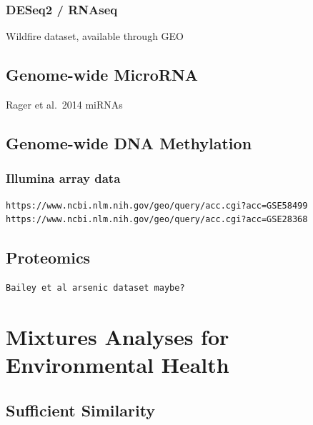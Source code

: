 \documentclass[
]{book}
\begin{document}
\hypertarget{deseq2-rnaseq}{%
\subsection{DESeq2 / RNAseq}\label{deseq2-rnaseq}}

Wildfire dataset, available through GEO

\hypertarget{genome-wide-microrna}{%
\section{Genome-wide MicroRNA}\label{genome-wide-microrna}}

Rager et al.~2014 miRNAs

\hypertarget{genome-wide-dna-methylation}{%
\section{Genome-wide DNA Methylation}\label{genome-wide-dna-methylation}}

\hypertarget{illumina-array-data}{%
\subsection{Illumina array data}\label{illumina-array-data}}

\begin{verbatim}
https://www.ncbi.nlm.nih.gov/geo/query/acc.cgi?acc=GSE58499
https://www.ncbi.nlm.nih.gov/geo/query/acc.cgi?acc=GSE28368
\end{verbatim}

\hypertarget{proteomics}{%
\section{Proteomics}\label{proteomics}}

\begin{verbatim}
Bailey et al arsenic dataset maybe?
\end{verbatim}

\hypertarget{mixtures-analyses-for-environmental-health}{%
\chapter{Mixtures Analyses for Environmental Health}\label{mixtures-analyses-for-environmental-health}}

\hypertarget{sufficient-similarity}{%
\section{Sufficient Similarity}\label{sufficient-similarity}}
\end{document}
